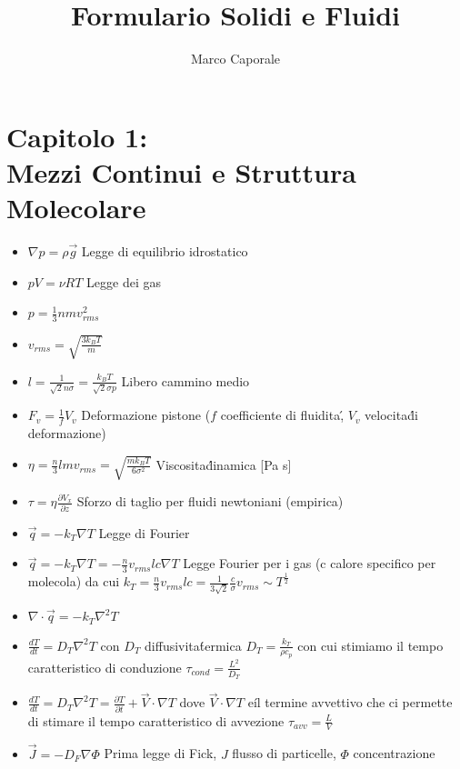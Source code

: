 \documentclass[a4paper]{article}
\begin{document}
	\title{Formulario Solidi e Fluidi}
	\author{Marco Caporale}
	\maketitle

\section{Capitolo 1:\\ Mezzi Continui e Struttura Molecolare}
\begin{itemize}
	\item $\nabla p = \rho \overrightarrow{g}$ Legge di equilibrio idrostatico
	\item $pV = \nu RT$ Legge dei gas
	\item $p = \frac{1}{3} nm v_{rms}^2$
	\item $v_{rms} = \sqrt{\frac{3k_B T}{m}}$
	\item $\textit{l} = \frac{1}{\sqrt{2} n \sigma} = \frac{k_B T}{\sqrt{2} \sigma p}$ Libero cammino medio
	\item $F_v = \frac{1}{f} V_v$ Deformazione pistone ($f$ coefficiente di fluidita\', $V_v$ velocita\' di deformazione)
	\item $\eta = \frac{n}{3}lmv_{rms} = \sqrt{\frac{mk_BT}{6 \sigma^2}}$  Viscosita\' dinamica [Pa s]
	\item $\tau = \eta \frac{\partial V_x}{\partial z}$ Sforzo di taglio per fluidi newtoniani (empirica)
	\item $\overrightarrow{q} = -k_T \nabla T$ Legge di Fourier
	\item $\overrightarrow{q} = -k_T \nabla T = -\frac{n}{3} v_{rms} l c \nabla T$ Legge Fourier per i gas (c calore specifico per molecola) da cui $k_T = \frac{n}{3} v_{rms}lc =\frac{1}{3 \sqrt{2}} \frac{c}{\sigma} v_{rms} \sim T^{\frac{1}{2}}$
	\item $\nabla \cdot \overrightarrow{q} = -k_T \nabla^2 T$
	\item $\frac{dT}{dt}=D_T \nabla^2 T$ con $D_T$ diffusivita\' termica $D_T = \frac{k_T}{\rho c_p}$ con cui stimiamo il tempo caratteristico di conduzione $\tau_{cond} = \frac{L^2}{D_T}$
	\item $\frac{dT}{dt}=D_T \nabla^2 T = \frac{\partial T}{\partial t} + \overrightarrow{V} \cdot \nabla T$ dove $\overrightarrow{V} \cdot \nabla T$ e\' il termine avvettivo che ci permette di stimare il tempo caratteristico di avvezione $\tau_{avv} = \frac{L}{V}$
	\item $\overrightarrow{J} = -D_F \nabla \Phi$ Prima legge di Fick, $J$ flusso di particelle, $\Phi$ concentrazione

\end{itemize}
\end{document}
